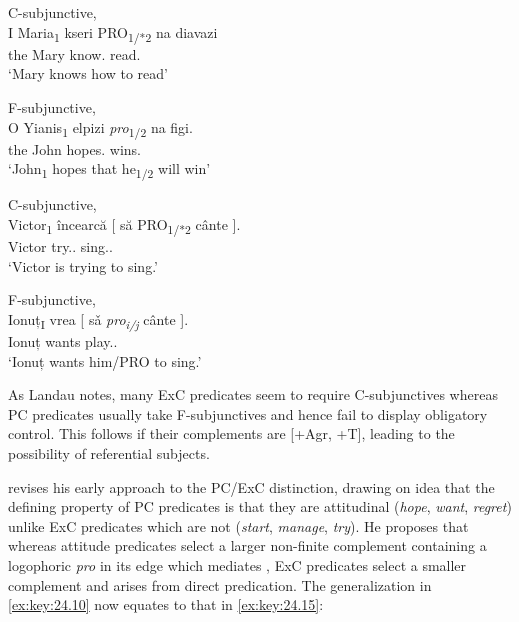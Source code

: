 \documentclass[output=paper]{langsci/langscibook}
\begin{document}
\ea\label{ex:key:24.11} C-subjunctive, \\
    \gll I Maria\textsubscript{1}   kseri PRO\textsubscript{1/*2} na   diavazi \\
		the Mary   know.\Tsg{} {}  \Ptcl{}   read.\Tsg{}\\
	\glt ‘Mary knows how to read’
\z

\ea\label{ex:key:24.12} F-subjunctive,  \parencite[(21)]{Varlokosta1994}\\
	\gll O Yianis\textsubscript{1}   elpizi  \emph{pro}\textsubscript{1/2} na   figi. \\
		the John   hopes.\Tsg{} {}    \Ptcl{}   wins.\Tsg{} \\
	\glt ‘John\textsubscript{1} hopes that he\textsubscript{1/2} will win’
\z

\ea\label{ex:key:24.13} C-subjunctive,  \parencite[6]{Alboiu2007}\\
	\gll Victor\textsubscript{1}  încearcă   [ să          PRO\textsubscript{1/*2} cânte ].\\
        Victor    try.\Prs.\Tsg{} {} \Sbjv{} {}    sing.\Sbjv.\Tsg{}\\
	\glt ‘Victor is trying to sing.’
\z

\ea\label{ex:key:24.14} F-subjunctive, \\
	\gll Ionuț\textsubscript{I} vrea  [ sǎ     \emph{pro\textsubscript{i/j}}\textsubscript{}  cânte ].\\
            Ionuț    wants {}  \Sbjv{} {} play.\Sbjv{}.\Tsg{}\\
	\glt ‘Ionuț wants him/PRO to sing.’
\z

As Landau notes, many \gls{ExC} predicates seem
to require C-subjunctives whereas \gls{PC}
predicates usually take F-subjunctives and hence fail to display obligatory
control. This follows if their complements are [+Agr, +T], leading to the
possibility of referential subjects.

\citet{Landau2015} revises his early approach to the \gls{PC}/\gls{ExC}
distinction, drawing on  idea that the defining property
of \gls{PC} predicates is that they are attitudinal
(\emph{hope}, \emph{want}, \emph{regret}) unlike
\gls{ExC} predicates which are not
(\emph{start}, \emph{manage}, \emph{try}). He proposes that whereas attitude
predicates select a larger non-finite complement containing a logophoric
\emph{pro} in its edge which mediates , \gls{ExC} predicates select a smaller complement and  arises from direct
predication. The generalization in \eqref{ex:key:24.10} now equates to that in
\eqref{ex:key:24.15}:
\end{document}
